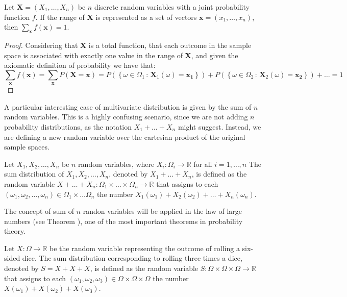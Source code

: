 \begin{proposition}
Let $\mathbf{X}=\left(X_{1}, \ldots, X_{n}\right)$ be $n$ discrete random variables with a joint probability function $f$. If the range of $\mathbf{X}$ is represented as a set of vectors $\mathbf{x} = (x_{1}, \ldots, x_{n})$, then $\sum_{\mathbf{x}}f\left(\mathbf{x}\right)=1$.
\end{proposition}
\begin{proof}
Considering that $\mathbf{X}$ is a total function, that each outcome in the sample space is associated with exactly one value in the range of $\mathbf{X}$, and given the axiomatic definition of probability we have that:
\[
\sum_{\mathbf{x}} f(\mathbf{x}) = \sum_{\mathbf{x}} P\left( \mathbf{X} = \mathbf{x} \right) = P \left( \left\{ \omega \in \Omega_1 \,:\, \mathbf{X}_1(\omega) = \mathbf{x_1} \right\} \right) + P \left( \left\{ \omega \in \Omega_2 \,:\, \mathbf{X}_2(\omega) = \mathbf{x_2} \right\} \right) + \ldots = 1 
\]
\end{proof}

A particular interesting case of multivariate distribution is given by the sum of $n$ random variables. This is a highly confusing scenario, since we are not adding $n$ probability distributions, as the notation $X_1 + \ldots + X_n$ might suggest. Instead, we are defining a new random variable over the cartesian product of the original sample spaces.

\begin{definition}
Let $X_1, X_2, \ldots, X_n$ be $n$ random variables, where $X_i : \Omega_i \rightarrow \mathbb{R}$ for all $i=1, \ldots, n$ The sum distribution of $X_1, X_2, \ldots, X_n$, denoted by $X_1 + \ldots + X_n$, is defined as the random variable $X + \ldots + X_n : \Omega_1 \times \ldots \times \Omega_n \rightarrow \mathbb{R}$ that assigns to each $\left( \omega_1, \omega_2, \ldots, \omega_n \right) \in \Omega_1 \times \ldots \Omega_n$ the number $X_1 \left( \omega_1 \right) + X_2 \left( \omega_2 \right) + \ldots + X_n \left( \omega_n \right)$.
\end{definition}

The concept of sum of $n$ randon variables will be applied in the law of large numbers (see Theorem \label{th:law_large_numbers}), one of the most important theorems in probability theory.

\begin{example}
Let $X: \Omega \rightarrow \mathbb{R}$ be the random variable representing the outcome of rolling a six-sided dice. The sum distribution corresponding to rolling three times a dice, denoted by $S = X + X + X$, is defined as the random variable $S: \Omega \times \Omega \times \Omega \rightarrow \mathbb{R}$ that assigns to each $\left( \omega_1, \omega_2, \omega_3 \right) \in \Omega \times \Omega \times \Omega$ the number $X \left( \omega_1 \right) + X \left( \omega_2 \right) + X \left( \omega_3 \right)$.
\end{example}

